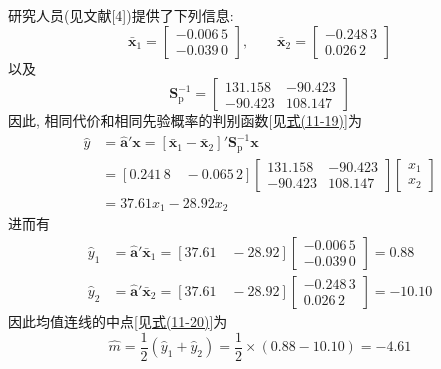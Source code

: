 研究人员(见文献[4])提供了下列信息:
\[
\bar{\mathbf{x}}_1=\begin{bmatrix}-0.006\,5\\-0.039\,0\end{bmatrix},\qquad \bar{\mathbf{x}}_2=\begin{bmatrix}-0.248\,3\\0.026\,2\end{bmatrix}
\]
以及
\[
\mathbf{S}_{\mathrm{p}}^{-1}=\begin{bmatrix}131.158&-90.423\\-90.423&108.147\end{bmatrix}
\]
因此, 相同代价和相同先验概率的判别函数[见\hyperref[eq:11-19]{式(11-19)}]为
\[
\begin{aligned}
\hat{y}&=\hat{\mathbf{a}}'\mathbf{x}=[\bar{\mathbf{x}}_1-\bar{\mathbf{x}}_2]'\mathbf{S}_{\mathrm{p}}^{-1}\mathbf{x}\\
&=[0.241\,8\quad -0.065\,2]\begin{bmatrix}131.158&-90.423\\-90.423&108.147\end{bmatrix}\begin{bmatrix}x_1\\x_2\end{bmatrix}\\
&=37.61x_1-28.92x_2
\end{aligned}
\]
进而有
\[
\begin{aligned}
\hat{y}_1&=\hat{\mathbf{a}}'\bar{\mathbf{x}}_1=[37.61\quad -28.92]\begin{bmatrix}-0.006\,5\\-0.039\,0\end{bmatrix}=0.88\\
\hat{y}_2&=\hat{\mathbf{a}}'\bar{\mathbf{x}}_2=[37.61\quad -28.92]\begin{bmatrix}-0.248\,3\\0.026\,2\end{bmatrix}=-10.10
\end{aligned}
\]
因此均值连线的中点[见\hyperref[eq:11-20]{式(11-20)}]为
\[
\hat{m}=\frac{1}{2}(\hat{y}_1+\hat{y}_2)=\frac{1}{2}\times(0.88-10.10)=-4.61
\]
